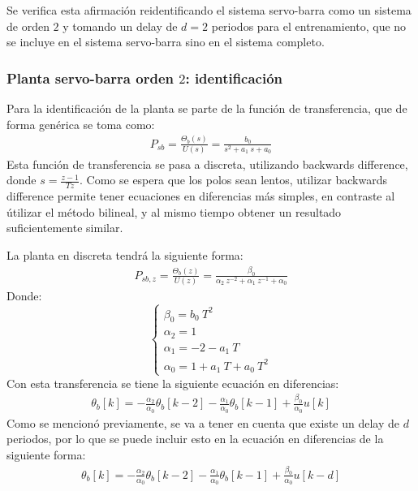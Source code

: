 \documentclass[a4paper,10pt]{article}
\begin{document}
Se verifica esta afirmación reidentificando el sistema servo-barra como un sistema de orden $2$ y tomando un delay de $d = 2$ periodos para el entrenamiento, que no se incluye en el sistema servo-barra sino en el sistema completo. 

\subsubsection{Planta servo-barra orden $2$: identificación}

Para la identificación de la planta se parte de la función de transferencia, que de forma genérica se toma como:
\begin{align*}
    P_{sb} = \frac{\Theta_b(s)}{U(s)} = \frac{b_0}{s^2 + a_1 ~ s + a_0}
\end{align*}
Esta función de transferencia se pasa a discreta, utilizando backwards difference, donde $s = \frac{z - 1}{T z}$. Como se espera que los polos sean lentos, utilizar backwards difference permite tener ecuaciones en diferencias más simples, en contraste al útilizar el método bilineal, y al mismo tiempo obtener un resultado suficientemente similar.

La planta en discreta tendrá la siguiente forma:
\begin{align*}
    P_{sb,z} = \frac{\Theta_b(z)}{U(z)} = \frac{\beta_0}{\alpha_2 ~ z^{-2} + \alpha_1 ~ z^{-1} + \alpha_0}
\end{align*}
Donde: \begin{equation*}
    \begin{cases}
        \beta_0 = b_0 ~ T^2\\
        \alpha_2 = 1 \\
        \alpha_1 = -2 - a_1 ~ T \\
        \alpha_0 = 1 + a_1 ~ T + a_0 ~ T^2
    \end{cases}
\end{equation*}
Con esta transferencia se tiene la siguiente ecuación en diferencias:
\begin{align*}
    \theta_b[k] = -\frac{\alpha_2}{\alpha_0} \theta_b[k - 2] - \frac{\alpha_1}{\alpha_0} \theta_b[k - 1] + \frac{\beta_0}{\alpha_0} u[k]
\end{align*}
Como se mencionó previamente, se va a tener en cuenta que existe un delay de $d$ periodos, por lo que se puede incluir esto en la ecuación en diferencias de la siguiente forma:
\begin{align*}
    \theta_b[k] = -\frac{\alpha_2}{\alpha_0} \theta_b[k - 2] - \frac{\alpha_1}{\alpha_0} \theta_b[k - 1] + \frac{\beta_0}{\alpha_0} u[k - d]
\end{align*}
\end{document}

